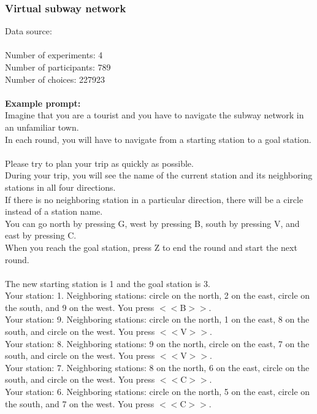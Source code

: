 \documentclass[pdflatex,sn-nature]{sn-jnl}%
\theoremstyle{thmstyleone}%
\theoremstyle{thmstyletwo}%
\theoremstyle{thmstylethree}%
\begin{document}
\subsubsection*{Virtual subway network}
Data source: \cite{tomov2020discovery} \\ $~$ \\
Number of experiments: 4 $~$\\ 
Number of participants: 789 $~$\\ 
Number of choices: 227923 $~$\\ 
 $~$\\ 
\textbf{Example prompt:}
 $~$\\ 
Imagine that you are a tourist and you have to navigate the subway network in an unfamiliar town. $~$\\ 
In each round, you will have to navigate from a starting station to a goal station. $~$\\ 
Please try to plan your trip as quickly as possible. $~$\\ 
During your trip, you will see the name of the current station and its neighboring stations in all four directions. $~$\\ 
If there is no neighboring station in a particular direction, there will be a circle instead of a station name. $~$\\ 
You can go north by pressing G, west by pressing B, south by pressing V, and east by pressing C. $~$\\ 
When you reach the goal station, press Z to end the round and start the next round. $~$\\ 
 $~$\\ 
The new starting station is 1 and the goal station is 3. $~$\\ 
Your station: 1. Neighboring stations: circle on the north, 2 on the east, circle on the south, and 9 on the west. You press $<<$B$>>$. $~$\\ 
Your station: 9. Neighboring stations: circle on the north, 1 on the east, 8 on the south, and circle on the west. You press $<<$V$>>$. $~$\\ 
Your station: 8. Neighboring stations: 9 on the north, circle on the east, 7 on the south, and circle on the west. You press $<<$V$>>$. $~$\\ 
Your station: 7. Neighboring stations: 8 on the north, 6 on the east, circle on the south, and circle on the west. You press $<<$C$>>$. $~$\\ 
Your station: 6. Neighboring stations: circle on the north, 5 on the east, circle on the south, and 7 on the west. You press $<<$C$>>$. $~$\\ 
\end{document}
